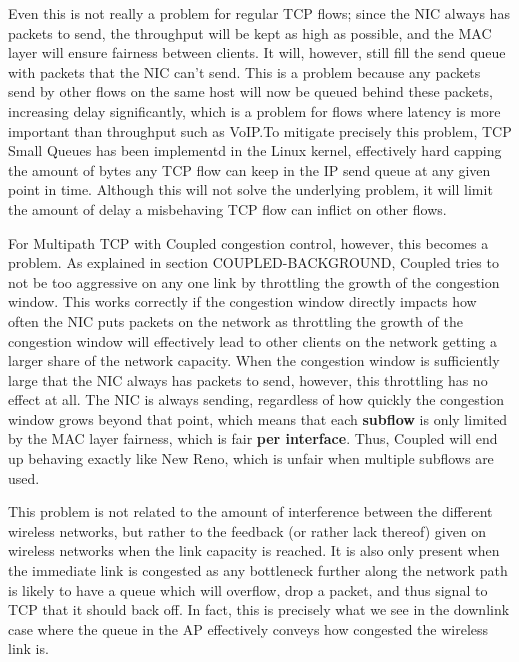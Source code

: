 Even this is not really a problem for regular TCP flows; since the NIC always
has packets to send, the throughput will be kept as high as possible, and the
MAC layer will ensure fairness between clients. It will, however, still fill the
send queue with packets that the NIC can't send. This is a problem because any
packets send by other flows on the same host will now be queued behind these
packets, increasing delay significantly, which is a problem for flows where
latency is more important than throughput such as VoIP.\@  To mitigate precisely
this problem, TCP Small Queues has been implementd in the Linux kernel,
effectively hard capping the amount of bytes any TCP flow can keep in the IP
send queue at any given point in time. Although this will not solve the
underlying problem, it will limit the amount of delay a misbehaving TCP flow can
inflict on other flows.

For Multipath TCP with Coupled congestion control, however, this becomes a problem. As explained in section COUPLED-BACKGROUND, Coupled tries to not be   %
too aggressive on any one link by throttling the growth of the congestion
window. This works correctly if the congestion window directly impacts how often the
NIC puts packets on the network as throttling the growth of the congestion
window will effectively lead to other clients on the network getting a larger
share of the network capacity. When the congestion window is sufficiently large
that the NIC always has packets to send, however, this throttling has no effect
at all. The NIC is always sending, regardless of how quickly the congestion
window grows beyond that point, which means that each \textbf{subflow} is only
limited by the MAC layer fairness, which is fair \textbf{per interface}. Thus,
Coupled will end up behaving exactly like New Reno, which is unfair when multiple subflows are used.

This problem is not related to the amount of interference between the different
wireless networks, but rather to the feedback (or rather lack thereof) given on
wireless networks when the link capacity is reached. It is also only present
when the immediate link is congested as any bottleneck further along the network path is
likely to have a queue which will overflow, drop a packet, and thus signal to TCP that
it should back off. In fact, this is precisely what we see in the downlink case
where the queue in the AP effectively conveys how congested the wireless link
is.

